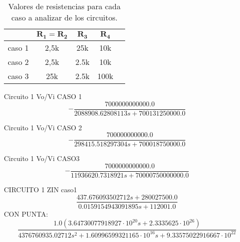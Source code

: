\begin{table}[h!]
	\centering
	\begin{tabular}{c c c c c}%
		\bfseries  & $\bm{R_1 = R_2}$ & $\bm{R_3}$ & $\bm{R_4}$  \\ \hline
		caso 1 & 2,5k & 25k & 10k \\
		caso 2 & 2,5k & 2.5k & 10k \\
		caso 3 & 25k & 2.5k & 100k \\
		\hline
	\end{tabular}
	\caption{Valores de resistencias para cada caso a analizar de los circuitos.}
	\label{casos}
\end{table}



























Circuito 1 Vo/Vi CASO 1
\begin{equation}
- \frac{7000000000000.0}{2088908.62808113 s + 700131250000.0}
\end{equation}

Circuito 1 Vo/Vi CASO 2
\begin{equation}
- \frac{700000000000.0}{298415.518297304 s + 700018750000.0}
\end{equation}

Circuito 1 Vo/Vi CASO3
\begin{equation}
- \frac{7000000000000.0}{11936620.7318921 s + 70000750000000.0}
\end{equation}

CIRCUITO 1 ZIN
caso1
\begin{equation}
\frac{437.676093502712 s + 280027500.0}{0.0159154943091895 s + 112001.0}
\end{equation}
CON PUNTA:
\begin{equation}
\frac{1.0 \left(3.64730077918927 \cdot 10^{20} s + 2.3335625 \cdot 10^{26}\right)}{4376760935.02712 s^{2} + 1.60996599321165 \cdot 10^{16} s + 9.33575022916667 \cdot 10^{22}}
\end{equation}

